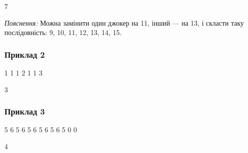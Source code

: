 \documentclass[12pt,a4paper]{article}
\begin{document}
\textbf{}

\begin{codeblock}
7
\end{codeblock}
\emph{Пояснення:} Можна замінити один джокер на 11, інший --- на 13, і скласти таку послідовність: 9, 10, 11, 12, 13, 14, 15.


\subsubsection*{Приклад 2}

\textbf{}

\begin{codeblock}
1 1 1 2 1 1 3
\end{codeblock}

\textbf{}

\begin{codeblock}
3
\end{codeblock}


\subsubsection*{Приклад 3}

\textbf{}

\begin{codeblock}
5 6 5 6 5 6 5 6 5 6 5 0 0
\end{codeblock}

\textbf{}

\begin{codeblock}
4
\end{codeblock}
\end{document}
